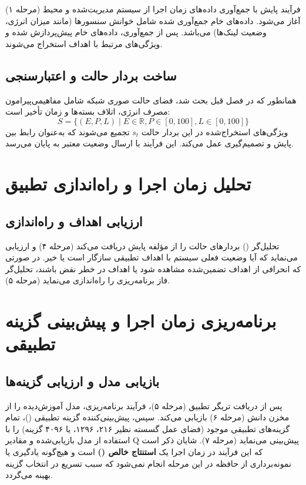 \documentclass[oneside,openany,phd]{TMU-Thesis}
\begin{document}
فرآیند پایش با جمع‌آوری داده‌های زمان اجرا از سیستم مدیریت‌شده و محیط (مرحله ۱) آغاز می‌شود. داده‌های خام جمع‌آوری شده شامل خوانش سنسورها (مانند میزان انرژی، وضعیت لینک‌ها) می‌باشد. پس از جمع‌آوری، داده‌های خام پیش‌پردازش شده و ویژگی‌های مرتبط با اهداف استخراج می‌شوند.

\subsection{ساخت بردار حالت و اعتبارسنجی}

همانطور که در فصل قبل بحث شد، فضای حالت صوری شبکه شامل مفاهیمی‌پیرامون مصرف انرژی، اتلاف بسته‌ها و زمان تأخیر است:
$$S = \{(E, P, L) \mid E \in \mathbb{R}, P \in [0,100], L \in [0,100]\}$$
ویژگی‌های استخراج‌شده در این بردار حالت $s_t$ تجمیع می‌شوند که به‌عنوان رابط بین پایش و تصمیم‌گیری عمل می‌کند. این فرآیند با ارسال وضعیت معتبر به پایان می‌رسد.

\section{تحلیل زمان اجرا و راه‌اندازی تطبیق}

\subsection{ارزیابی اهداف و راه‌اندازی}

تحلیل‌گر () بردارهای حالت را از مؤلفه پایش دریافت می‌کند (مرحله ۴) و ارزیابی می‌نماید که آیا وضعیت فعلی سیستم با اهداف تطبیقی سازگار است یا خیر. در صورتی که انحرافی از اهداف تضمین‌شده مشاهده شود یا اهداف در خطر نقض باشند، تحلیل‌گر فاز برنامه‌ریزی را راه‌اندازی می‌نماید (مرحله ۵).

\section{برنامه‌ریزی زمان اجرا و پیش‌بینی گزینه تطبیقی}

\subsection{بازیابی مدل و ارزیابی گزینه‌ها}

پس از دریافت تریگر تطبیق (مرحله ۵)، فرآیند برنامه‌ریزی، مدل آموزش‌دیده  را از مخزن دانش (مرحله ۶) بازیابی می‌کند.
سپس، پیش‌بینی‌کننده گزینه تطبیقی ()، تمام گزینه‌های تطبیقی موجود (فضای عمل گسسته نظیر ۲۱۶، ۱۲۹۶، یا ۴۰۹۶ گزینه) را با استفاده از مدل بازیابی‌شده و مقادیر Q پیش‌بینی می‌نماید (مرحله ۷).
شایان ذکر است که این فرآیند در زمان اجرا یک \textbf{استنتاج خالص ()} است و هیچ‌گونه یادگیری یا نمونه‌برداری از حافظه در این مرحله انجام نمی‌شود که سبب تسریع در انتخاب گزینه بهینه می‌گردد.
\end{document}
